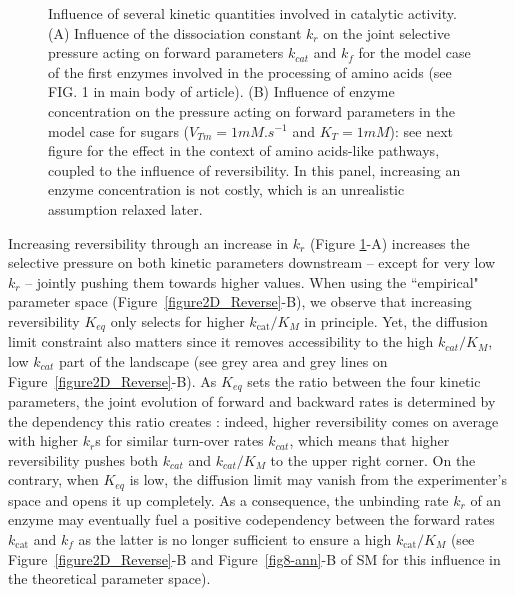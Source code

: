 \begin{figure}[h!]
\begin{minipage}[c]{0.49\linewidth}
\end{minipage}
\caption{Influence of several kinetic quantities involved in catalytic activity. (A) Influence of the dissociation constant $k_r$ on the joint selective pressure acting on forward parameters $k_{cat}$ and $k_f$ for the model case of the first enzymes involved in the processing of amino acids (see FIG. 1 in main body of article). (B) Influence of enzyme concentration on the pressure acting on forward parameters in the model case for sugars ($V_{Tm}=1mM.s^{-1}$ and $K_T=1mM$): see next figure for the effect in the context of amino acids-like pathways, coupled to the influence of reversibility. In this panel, increasing an enzyme concentration is not costly, which is an unrealistic assumption relaxed later.}
\label{fig9-ann}
\end{figure}

Increasing reversibility through an increase in $k_r$ (Figure \ref{fig9-ann}-A) increases the selective pressure on both kinetic parameters downstream -- except for very low $k_r$ -- jointly pushing them towards higher values. %
When using the ``empirical" parameter space (Figure~\ref{figure2D_Reverse}-B), we observe that increasing reversibility $K_{eq}$ only selects for higher $k_\text{cat}/K_M$ in principle. Yet, the diffusion limit constraint also matters since it removes accessibility to the high $k_{cat}/K_M$, low $k_{cat}$ part of the landscape (see grey area and grey lines on Figure~\ref{figure2D_Reverse}-B). As $K_{eq}$ sets the ratio between the four kinetic parameters, the joint evolution of forward and backward rates is determined by the dependency this ratio creates : indeed, higher reversibility comes on average with higher $k_r$s for similar turn-over rates $k_{cat}$, which means that higher reversibility pushes both $k_{cat}$ and $k_{cat}/K_M$ to the upper right corner. On the contrary, when $K_{eq}$ is low, the diffusion limit may vanish from the experimenter's space and opens it up completely. As a consequence, the unbinding rate $k_r$ of an enzyme may eventually fuel a positive codependency between the forward rates $k_\text{cat}$ and $k_f$ as the latter is no longer sufficient to ensure a high $k_\text{cat}/K_M$ (see Figure~\ref{figure2D_Reverse}-B and Figure~\ref{fig8-ann}-B of SM for this influence in the theoretical parameter space).


